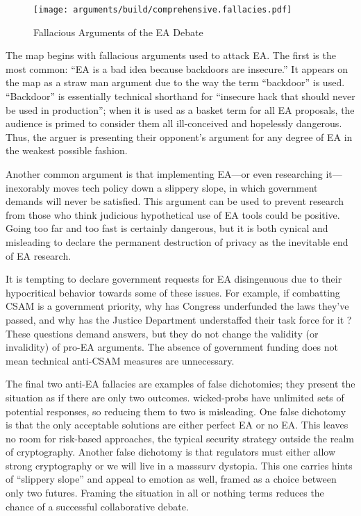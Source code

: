 \begin{figure}[t!]
  \centering\CaptionFontSize
  \texttt{[image: arguments/build/comprehensive.fallacies.pdf]}
  \caption{Fallacious Arguments of the EA Debate}
  \label{fig-arg-fallacies}
\end{figure}

The map begins with fallacious arguments used to attack \ac{EA}. The first is the most common: ``\ac{EA} is a bad idea
because backdoors are insecure.'' It appears on the map as a straw man argument due to the way the term ``backdoor'' is
used. ``Backdoor'' is essentially technical shorthand for ``insecure hack that should never be used in production'';
when it is used as a basket term for all \ac{EA} proposals, the audience is primed to consider them all ill-conceived
and hopelessly dangerous. Thus, the arguer is presenting their opponent's argument for any degree of \ac{EA} in the
weakest possible fashion.

Another common argument is that implementing \ac{EA}---or even researching it---inexorably moves tech policy down a
slippery slope, in which government demands will never be satisfied. This argument can be used to prevent research from
those who think judicious hypothetical use of \ac{EA} tools could be positive. Going too far and too fast is certainly
dangerous, but it is both cynical and misleading to declare the permanent destruction of privacy as the inevitable end
of \ac{EA} research.

It is tempting to declare government requests for \ac{EA} disingenuous due to their hypocritical behavior towards some
of these issues. For example, if combatting \ac{CSAM} is a government priority, why has Congress underfunded the laws
they've passed, and why has the Justice Department understaffed their task force for it \cite{keller_internet_2019}?
These questions demand answers, but they do not change the validity (or invalidity) of pro-\ac{EA} arguments. The
absence of government funding does not mean technical anti-\ac{CSAM} measures are unnecessary.

The final two anti-\ac{EA} fallacies are examples of false dichotomies; they present the situation as if there are only
two outcomes. \Acp{wicked-prob} have unlimited sets of potential responses, so reducing them to two is misleading. One
false dichotomy is that the only acceptable solutions are either perfect \ac{EA} or no \ac{EA}. This leaves no room for
risk-based approaches, the typical security strategy outside the realm of cryptography. Another false dichotomy is that
regulators must either allow strong cryptography or we will live in a \ac{masssurv} dystopia. This one carries hints of
``slippery slope'' and appeal to emotion as well, framed as a choice between only two futures. Framing the situation in
all or nothing terms reduces the chance of a successful collaborative debate.

